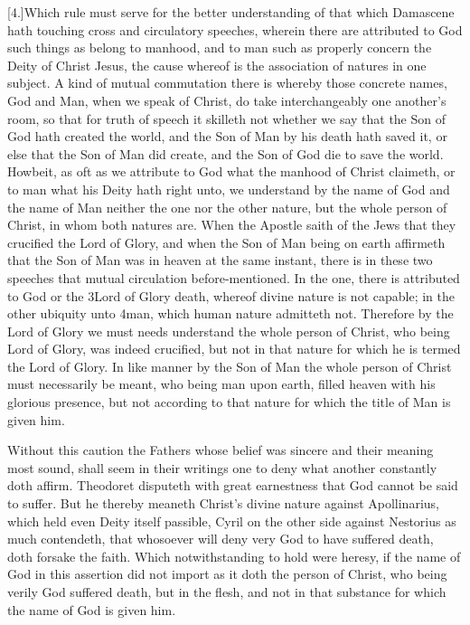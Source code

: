 [4.]Which rule must serve for the better understanding of that which Damascene hath touching cross and circulatory speeches, wherein there are attributed to God such things as belong to manhood, and to man such as properly concern the Deity of Christ Jesus, the cause whereof is the association of natures in one subject. A kind of mutual commutation there is whereby those concrete names, God and Man, when we speak of Christ, do take interchangeably one another’s room, so that for truth of speech it skilleth not whether we say that the Son of God hath created the world, and the Son of Man by his death hath saved it, or else that the Son of Man did create, and the Son of God die to save the world. Howbeit, as oft as we attribute to God what the manhood of Christ claimeth, or to man what his Deity hath right unto, we understand by the name of God and the name of Man neither the one nor the other nature, but the whole person of Christ, in whom both natures are. When the Apostle saith of the Jews that they crucified the Lord of Glory, and when the Son of Man being on earth affirmeth that the Son of Man was in heaven at the same instant, there is in these two speeches that mutual circulation before-mentioned. In the one, there is attributed to God or the 3Lord of Glory death, whereof divine nature is not capable; in the other ubiquity unto 4man, which human nature admitteth not. Therefore by the Lord of Glory we must needs understand the  whole person of Christ, who being Lord of Glory, was indeed crucified, but not in that nature for which he is termed the Lord of Glory.
 In like manner by the Son of Man the whole person of Christ must necessarily be meant, who being man upon earth, filled heaven with his glorious presence, but not according to that nature for which the title of Man is given him.

Without this caution the Fathers whose belief was sincere and their meaning most sound, shall seem in their writings one to deny what another constantly doth affirm. Theodoret disputeth with great earnestness that God cannot be said to suffer. But he thereby meaneth Christ’s divine nature against Apollinarius, which held even Deity itself passible, Cyril on the other side against Nestorius as much contendeth, that whosoever will deny very God to have suffered death, doth forsake the faith. Which notwithstanding to hold were heresy, if the name of God in this assertion did not import as it doth the person of Christ, who being verily God suffered death, but in the flesh, and not in that substance for which the name of God is given him.


